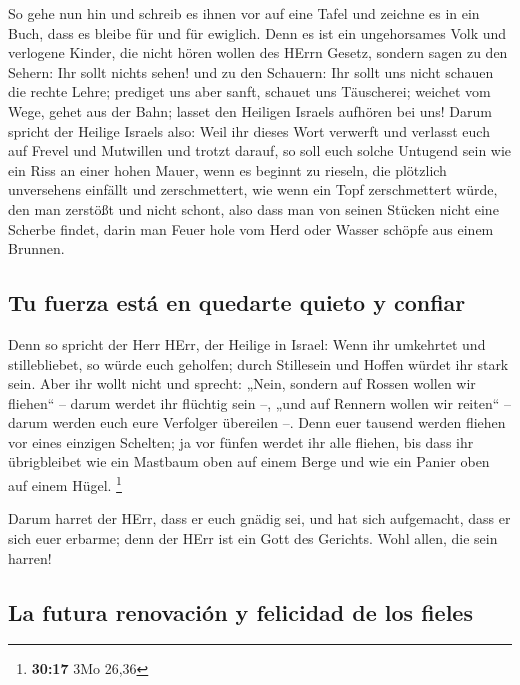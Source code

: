  So gehe nun hin und schreib es ihnen vor auf eine Tafel
und zeichne es in ein Buch, dass es bleibe für und für ewiglich.
 Denn es ist ein ungehorsames Volk und verlogene Kinder,
die nicht hören wollen des HErrn Gesetz,  sondern sagen
zu den Sehern: Ihr sollt nichts sehen! und zu den Schauern: Ihr sollt
uns nicht schauen die rechte Lehre; prediget uns aber sanft, schauet uns
Täuscherei;  weichet vom Wege, gehet aus der Bahn; lasset
den Heiligen Israels aufhören bei uns!  Darum spricht der
Heilige Israels also: Weil ihr dieses Wort verwerft und verlasst euch
auf Frevel und Mutwillen und trotzt darauf,  so soll euch
solche Untugend sein wie ein Riss an einer hohen Mauer, wenn es beginnt
zu rieseln, die plötzlich unversehens einfällt und zerschmettert,
 wie wenn ein Topf zerschmettert würde, den man zerstößt
und nicht schont, also dass man von seinen Stücken nicht eine Scherbe
findet, darin man Feuer hole vom Herd oder Wasser schöpfe aus einem
Brunnen.

\hypertarget{tu-fuerza-estuxe1-en-quedarte-quieto-y-confiar}{%
\subsection{Tu fuerza está en quedarte quieto y
confiar}\label{tu-fuerza-estuxe1-en-quedarte-quieto-y-confiar}}

 Denn so spricht der Herr HErr, der Heilige in Israel:
Wenn ihr umkehrtet und stillebliebet, so würde euch geholfen; durch
Stillesein und Hoffen würdet ihr stark sein. Aber ihr wollt nicht
 und sprecht: „Nein, sondern auf Rossen wollen wir
fliehen`` -- darum werdet ihr flüchtig sein --, „und auf Rennern wollen
wir reiten`` -- darum werden euch eure Verfolger übereilen --.
 Denn euer tausend werden fliehen vor eines einzigen
Schelten; ja vor fünfen werdet ihr alle fliehen, bis dass ihr
übrigbleibet wie ein Mastbaum oben auf einem Berge und wie ein Panier
oben auf einem Hügel. \footnote{\textbf{30:17} 3Mo 26,36}

 Darum harret der HErr, dass er euch gnädig sei, und hat
sich aufgemacht, dass er sich euer erbarme; denn der HErr ist ein Gott
des Gerichts. Wohl allen, die sein harren!

\hypertarget{la-futura-renovaciuxf3n-y-felicidad-de-los-fieles}{%
\subsection{La futura renovación y felicidad de los
fieles}\label{la-futura-renovaciuxf3n-y-felicidad-de-los-fieles}}

